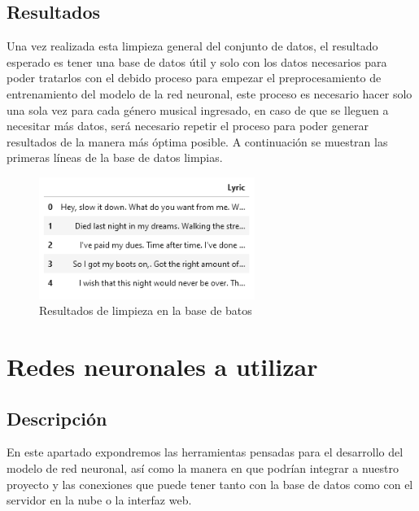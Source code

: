 \documentclass[12pt, a4paper, titlepage]{report}
\begin{document}
		\subsection{Resultados} %
		Una vez realizada esta limpieza general del conjunto de datos, el resultado esperado es tener una base de datos útil y solo con los datos necesarios para poder tratarlos con el debido proceso para empezar el preprocesamiento de entrenamiento del modelo de la red neuronal, este proceso es necesario hacer solo una sola vez para cada género musical ingresado, en caso de que se lleguen a necesitar más datos, será necesario repetir el proceso para poder generar resultados de la manera más óptima posible.
		A continuación se muestran las primeras líneas de la base de datos limpias.
		\begin{figure}[H]
			\includegraphics[width=7cm]{./imagenes/Disenio/Iteracion_2/Base_de_Datos/ResultadosLimpiezaBasedeDatos.png}
			\centering 
			\caption{Resultados de limpieza en la base de batos}
		\end{figure}
\newpage

\section{Redes neuronales a utilizar} %
		\subsection{Descripción}
		En este apartado expondremos las herramientas pensadas para el desarrollo del modelo de red neuronal, así como la manera en que podrían integrar a nuestro proyecto y las conexiones que puede tener tanto con la base de datos como con el servidor en la nube o la interfaz web. 
\end{document}
